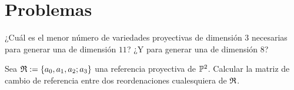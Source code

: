\section{Problemas}
\begin{prob}
	¿Cuál es el menor número de variedades proyectivas de dimensión $3$ necesarias para generar una de dimensión $11$? ¿Y para generar una de dimensión $8$?
\end{prob}
\begin{prob}
	Sea $\mathfrak{R}:=\{a_0,a_1,a_2;a_3\}$ una referencia proyectiva de $\mathbb{P}^2$. Calcular la matriz de cambio de referencia entre dos reordenaciones cualesquiera de $\mathfrak{R}$.
\end{prob}